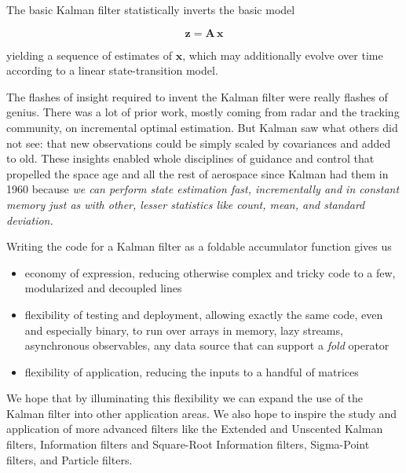\documentclass[10pt,oneside,x11names]{article}
\begin{document}
The basic Kalman filter statistically inverts the basic model

\begin{equation}
\mathbold{z} = \mathbold{A}\,\mathbold{x}
\end{equation}

\noindent yielding a sequence of estimates of \(\mathbold{x}\), which may
additionally evolve over time according to a linear state-transition model.

The flashes of insight required to invent the Kalman filter were really flashes
of genius. There was a lot of prior work, mostly coming from radar and the
tracking community, on incremental optimal estimation. But Kalman saw what
others did not see: that new observations could be simply scaled by covariances
and added to old. These insights enabled whole disciplines of guidance and
control that propelled the space age and all the rest of aerospace since Kalman
had them in 1960 because
\emph{we can perform state estimation fast, incrementally and in constant memory just as with other, lesser statistics like count, mean, and standard deviation.}

Writing the code for a Kalman filter as a foldable accumulator function gives us
\begin{itemize}
\item economy of expression, reducing otherwise complex and tricky code
to a few, modularized and decoupled lines
\item flexibility of testing and deployment, allowing exactly the same
code, even and especially binary, to run over arrays in
memory, lazy streams, asynchronous observables, any data source
that can support a \emph{fold} operator
\item flexibility of application, reducing the inputs to a handful
of  matrices
\end{itemize}

We hope that by illuminating this flexibility we can expand the use of the
Kalman filter into other application areas. We also hope to inspire the study
and application of more advanced filters like the Extended and Unscented Kalman
filters, Information filters and Square-Root Information filters, Sigma-Point
filters, and Particle filters.
\end{document}
